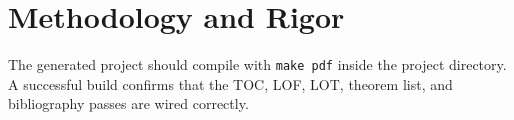 \section{Methodology and Rigor}
\label{sec:methodology-and-rigor}

\begin{tcolorbox}[colback=blue!3, colframe=upcblue, title=Validation checklist]
The generated project should compile with \texttt{make pdf} inside the project directory. A successful build confirms that the TOC, LOF, LOT, theorem list, and bibliography passes are wired correctly.
\end{tcolorbox}
